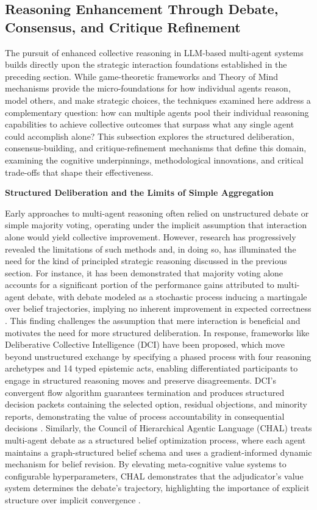 \documentclass[11pt]{article}
\begin{document}
\subsection{Reasoning Enhancement Through Debate, Consensus, and Critique Refinement}

The pursuit of enhanced collective reasoning in LLM-based multi-agent systems builds directly upon the strategic interaction foundations established in the preceding section. While game-theoretic frameworks and Theory of Mind mechanisms provide the micro-foundations for how individual agents reason, model others, and make strategic choices, the techniques examined here address a complementary question: how can multiple agents pool their individual reasoning capabilities to achieve collective outcomes that surpass what any single agent could accomplish alone? This subsection explores the structured deliberation, consensus-building, and critique-refinement mechanisms that define this domain, examining the cognitive underpinnings, methodological innovations, and critical trade-offs that shape their effectiveness.

\textbf{Structured Deliberation and the Limits of Simple Aggregation}

Early approaches to multi-agent reasoning often relied on unstructured debate or simple majority voting, operating under the implicit assumption that interaction alone would yield collective improvement. However, research has progressively revealed the limitations of such methods and, in doing so, has illuminated the need for the kind of principled strategic reasoning discussed in the previous section. For instance, it has been demonstrated that majority voting alone accounts for a significant portion of the performance gains attributed to multi-agent debate, with debate modeled as a stochastic process inducing a martingale over belief trajectories, implying no inherent improvement in expected correctness \cite{ref203}. This finding challenges the assumption that mere interaction is beneficial and motivates the need for more structured deliberation. In response, frameworks like Deliberative Collective Intelligence (DCI) have been proposed, which move beyond unstructured exchange by specifying a phased process with four reasoning archetypes and 14 typed epistemic acts, enabling differentiated participants to engage in structured reasoning moves and preserve disagreements. DCI's convergent flow algorithm guarantees termination and produces structured decision packets containing the selected option, residual objections, and minority reports, demonstrating the value of process accountability in consequential decisions \cite{ref86}. Similarly, the Council of Hierarchical Agentic Language (CHAL) treats multi-agent debate as a structured belief optimization process, where each agent maintains a graph-structured belief schema and uses a gradient-informed dynamic mechanism for belief revision. By elevating meta-cognitive value systems to configurable hyperparameters, CHAL demonstrates that the adjudicator's value system determines the debate's trajectory, highlighting the importance of explicit structure over implicit convergence \cite{ref204}.
\end{document}
